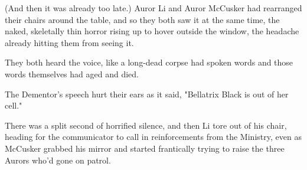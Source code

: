 (And then it was already too late.)
\later
Auror Li and Auror McCusker had rearranged their chairs around the table, and
so they both saw it at the same time, the naked, skeletally thin horror rising
up to hover outside the window, the headache already hitting them from seeing
it.

They both heard the voice, like a long-dead corpse had spoken words and those
words themselves had aged and died.

The Dementor's speech hurt their ears as it said, "Bellatrix Black is out of
her cell."

There was a split second of horrified silence, and then Li tore out of his
chair, heading for the communicator to call in reinforcements from the
Ministry, even as McCusker grabbed his mirror and started frantically trying to
raise the three Aurors who'd gone on patrol.
